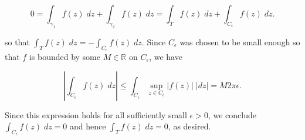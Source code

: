\begin{solution}
    $$
    0 = \int_{\gamma_1} f(z) \; dz + \int_{\gamma_2} f(z) \; dz = \int_{T} f(z) \; dz + \int_{C_{\epsilon}} f(z) \; dz .
    $$

    so that $\int_{T} f(z) \; dz = -\int_{C_{\epsilon}} f(z) \; dz$. Since $C_{\epsilon}$ was chosen to be small enough
    so that $f$ is bounded by some $M \in \mathbb{R}$ on $C_{\epsilon}$, we have
    
    $$
    \left| \int_{C_{\epsilon}} f(z) \; dz \right| \leq \int_{C_{\epsilon}}\sup_{z \in C_{\epsilon}} |f(z)| \; |dz| = M 2 \pi \epsilon.
    $$

    Since this expression holds for all sufficiently small $\epsilon > 0$, we conclude
    $\int_{C_{\epsilon}} f(z) \; dz = 0$ and hence $\int_{T} f(z) \; dz = 0$, as desired.
    \ \\
\end{solution}